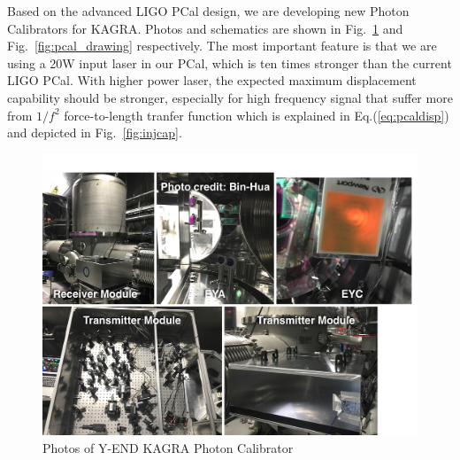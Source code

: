 Based on the advanced LIGO PCal design, we are developing new Photon Calibrators for KAGRA. Photos and schematics are shown in Fig.~\ref{fig:pcal_photo} and Fig.~\ref{fig:pcal_drawing} respectively. The most important feature is that we are using a 20W input laser in our PCal, which is ten times stronger than the current LIGO PCal. With higher power laser, the expected maximum displacement capability should be stronger, especially for high frequency signal that suffer more from $1/f^2$ force-to-length tranfer function which is explained in Eq.(\ref{eq:pcaldisp}) and depicted in Fig.~\ref{fig:injcap}. 
 
\begin{figure}[hbt!]
\centering
\includegraphics[width=1\textwidth]{figure/pcal/pcal_photo.pdf}
\caption[Photos of Y-END KAGRA Photon Calibrator]{Photos of Y-END KAGRA Photon Calibrator  }
\label{fig:pcal_photo}
\end{figure}
 

